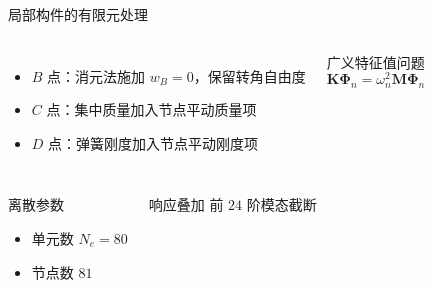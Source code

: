 \documentclass[UTF8,aspectratio=169,10pt]{ctexbeamer}
\begin{document}
\begin{frame}{局部构件的有限元处理}
  \begin{columns}[T,onlytextwidth]
    \begin{itemize}
      \item $B$ 点：消元法施加 $w_B=0$，保留转角自由度
      \item $C$ 点：集中质量加入节点平动质量项
      \item $D$ 点：弹簧刚度加入节点平动刚度项
    \end{itemize}
    \begin{block}{广义特征值问题}
      \[
      \mathbf K\boldsymbol\Phi_n
      =
      \omega_n^2
      \mathbf M\boldsymbol\Phi_n
      \]
    \end{block}
  \end{columns}
  \vspace{0.6em}
  \begin{columns}[T,onlytextwidth]
    \begin{block}{离散参数}
      \begin{itemize}
        \item 单元数 $N_e=80$
        \item 节点数 $81$
      \end{itemize}
    \end{block}
    \begin{block}{响应叠加}
      前 $24$ 阶模态截断
    \end{block}
  \end{columns}
\end{frame}
\end{document}
